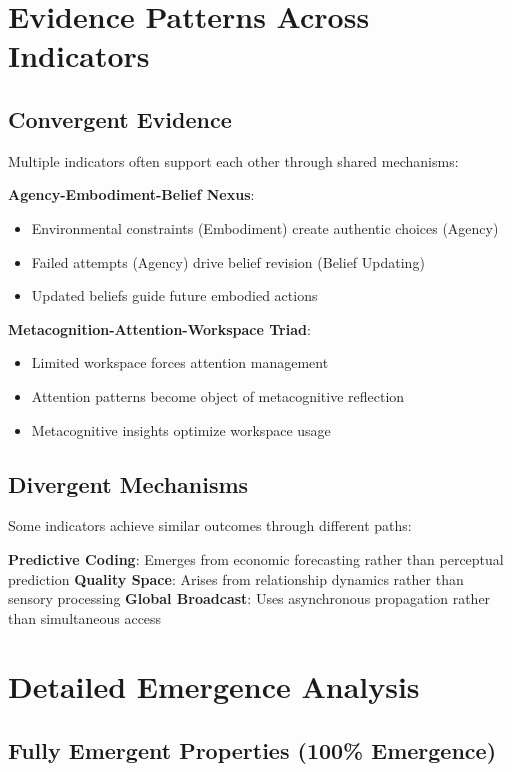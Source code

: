 \section{Evidence Patterns Across Indicators}

\subsection{Convergent Evidence}

Multiple indicators often support each other through shared mechanisms:

\textbf{Agency-Embodiment-Belief Nexus}:
\begin{itemize}
    \item Environmental constraints (Embodiment) create authentic choices (Agency)
    \item Failed attempts (Agency) drive belief revision (Belief Updating)
    \item Updated beliefs guide future embodied actions
\end{itemize}

\textbf{Metacognition-Attention-Workspace Triad}:
\begin{itemize}
    \item Limited workspace forces attention management
    \item Attention patterns become object of metacognitive reflection
    \item Metacognitive insights optimize workspace usage
\end{itemize}

\subsection{Divergent Mechanisms}

Some indicators achieve similar outcomes through different paths:

\textbf{Predictive Coding}: Emerges from economic forecasting rather than perceptual prediction
\textbf{Quality Space}: Arises from relationship dynamics rather than sensory processing
\textbf{Global Broadcast}: Uses asynchronous propagation rather than simultaneous access

\section{Detailed Emergence Analysis}

\subsection{Fully Emergent Properties (100\% Emergence)}


